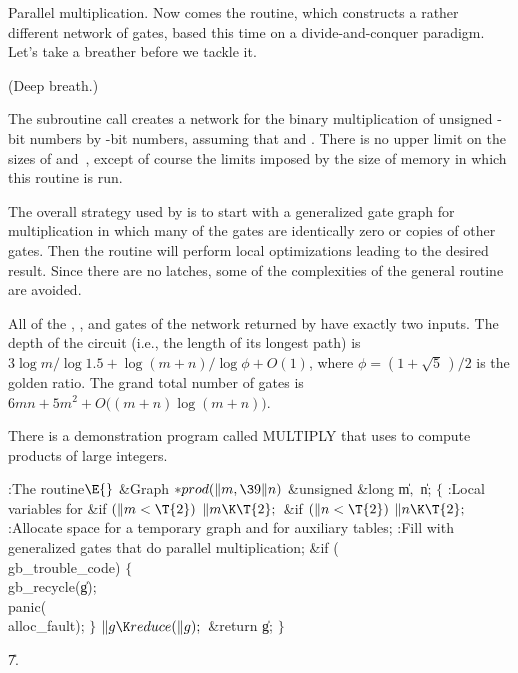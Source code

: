 Parallel multiplication. Now comes the  routine,
which constructs a rather different network of gates, based this time
on a divide-and-conquer paradigm. Let's take a breather before we tackle it.

(Deep breath.)

The subroutine call  creates
a network for the binary multiplication of unsigned
-bit numbers by -bit numbers, assuming that 
and .
There is no upper limit on the sizes of  and~, except of course
the limits imposed by the size of memory in which this routine is run.

The overall strategy used by  is to start with a generalized
gate graph for multiplication in which many of the gates are
identically zero or copies of other gates.  Then the  routine
will perform local optimizations leading to the desired result. Since
there are no latches, some of the complexities of the general 
routine are avoided.

All of the , , and  gates of the network
returned by
 have exactly two inputs. The depth of the circuit (i.e., the
length of its longest path) is $3\log m/\!\log 1.5 + \log(m+n)/\!\log\phi
+O(1)$, where $\phi=(1+\sqrt5\,)/2$ is the golden ratio. The grand total
number of gates is $6mn+5m^2+O\bigl((m+n)\log(m+n)\bigr)$.

There is a demonstration program called {\sc MULTIPLY} that uses 
to
compute products of large integers.

\Y\B\4:The  routine\X${}\E{}$\6
\1\1\&{Graph} ${}{*}\\{prod}(\|m,\39\|n){}$\6
\&{unsigned} \&{long} \|m${},{}$ \|n;\2\2\6
${}\{{}$\5
\1:Local variables for \X\7
\&{if} ${}(\|m<\T{2}){}$\1\5
${}\|m\K\T{2};{}$\2\6
\&{if} ${}(\|n<\T{2}){}$\1\5
${}\|n\K\T{2};{}$\2\6
:Allocate space for a temporary graph  and for auxiliary tables\X;\6
:Fill  with generalized gates that do parallel multiplication\X;\6
\&{if} (\\{gb\_trouble\_code})\5
${}\{{}$\1\6
\\{gb\_recycle}(\|g);\5
\\{panic}(\\{alloc\_fault});\6
\4${}\}{}$\2\6
${}\|g\K\\{reduce}(\|g);{}$\6
\&{return} \|g;\6
\4${}\}{}$\2\par
\U7.\fi

